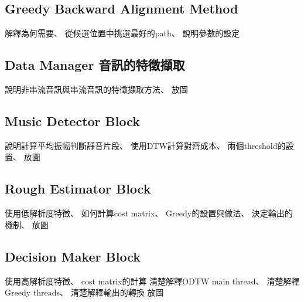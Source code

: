 \documentclass[class=NCU_thesis, crop=false]{standalone}
\begin{document}
\subsection{Greedy Backward Alignment Method}
解釋為何需要、
從候選位置中挑選最好的path、
說明參數的設定

\subsection{Data Manager 音訊的特徵擷取}
說明非串流音訊與串流音訊的特徵擷取方法、
放圖

\subsection{Music Detector Block}
說明計算平均振幅判斷靜音片段、
使用DTW計算對齊成本、
兩個threshold的設置、
放圖

\subsection{Rough Estimator Block}
使用低解析度特徵、
如何計算cost matrix、
Greedy的設置與做法、
決定輸出的機制、
放圖

\subsection{Decision Maker Block}
使用高解析度特徵、
cost matrix的計算
清楚解釋ODTW main thread、
清楚解釋Greedy threads、
清楚解釋輸出的轉換
放圖

\pagebreak
\end{document}
